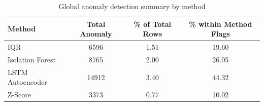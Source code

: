 \begin{table}[H]
\centering
\caption{Global anomaly detection summary by method}
\label{tab:app_global_method_summary}
\begin{tabular}{lccc}
\toprule
Method & Total Anomaly & \% of Total Rows & \% within Method Flags \\
\midrule
IQR & 6596 & 1.51 & 19.60 \\
Isolation Forest & 8765 & 2.00 & 26.05 \\
LSTM Autoencoder & 14912 & 3.40 & 44.32 \\
Z-Score & 3373 & 0.77 & 10.02 \\
\bottomrule
\end{tabular}
\end{table}